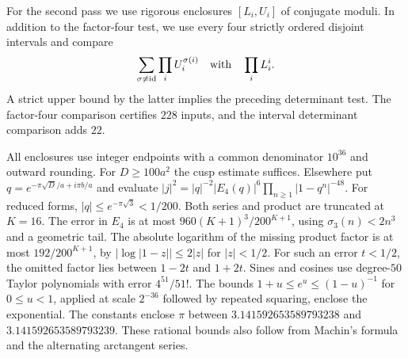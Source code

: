 For the second pass we use rigorous enclosures $[L_i,U_i]$ of conjugate
moduli. In addition to the factor-four test, we use every four strictly
ordered disjoint intervals and compare
\[
 \sum_{\sigma\ne\mathrm{id}}\prod_i U_i^{\sigma(i)}
 \quad\hbox{with}\quad \prod_i L_i^i.
\]
A strict upper bound by the latter implies the preceding determinant test.
The factor-four comparison certifies $228$ inputs, and the interval
determinant comparison adds $22$.

All enclosures use integer endpoints with a common denominator $10^{36}$
and outward rounding. For $D\ge100a^2$ the cusp estimate suffices.
Elsewhere put $q=e^{-\pi\sqrt D/a+i\pi b/a}$ and evaluate
$|j|^2=|q|^{-2}|E_4(q)|^6\prod_{n\ge1}|1-q^n|^{-48}$. For reduced forms,
$|q|\le e^{-\pi\sqrt3}<1/200$. Both series and product are truncated
at $K=16$. The error in $E_4$ is at most
$960(K+1)^3/200^{K+1}$, using $\sigma_3(n)<2n^3$ and a geometric tail.
The absolute logarithm of the missing product factor is at most
$192/200^{K+1}$, by $|\log|1-z||\le2|z|$ for $|z|<1/2$.
For such an error $t<1/2$, the omitted factor lies between $1-2t$ and
$1+2t$. Sines and cosines use degree-$50$ Taylor polynomials with error
$4^{51}/51!$. The bounds $1+u\le e^u\le(1-u)^{-1}$ for $0\le u<1$,
applied at scale $2^{-36}$ followed by repeated squaring, enclose the
exponential. The constants enclose $\pi$ between
$3.141592653589793238$ and $3.141592653589793239$. These rational bounds
also follow from Machin's formula and the alternating arctangent series.
